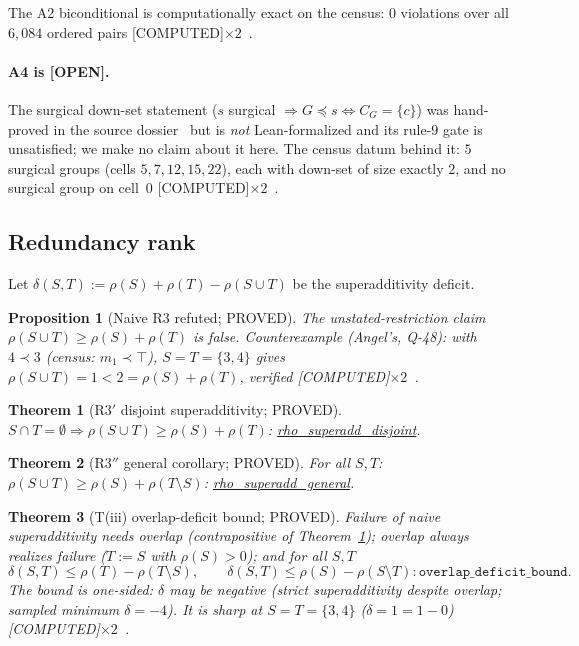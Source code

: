 \documentclass[11pt,a4paper]{article}
\newtheorem{theorem}{Theorem}
\newtheorem{proposition}{Proposition}
\theoremstyle{definition}
\begin{document}
The A2 biconditional is computationally exact on the census: $0$ violations
over all $6{,}084$ ordered pairs [COMPUTED]$\times2$~\cite{D304}.

\paragraph{A4 is [OPEN].} The surgical down-set statement
($s$ surgical $\Rightarrow G\preceq s\iff C_G=\{c\}$) was hand-proved in the
source dossier~\cite{D304} but is \emph{not} Lean-formalized and its rule-9
gate is unsatisfied; we make no claim about it here.  The census datum
behind it: $5$ surgical groups (cells $5,7,12,15,22$), each with down-set of
size exactly $2$, and no surgical group on cell~$0$
[COMPUTED]$\times2$~\cite{D304}.

\subsection{Redundancy rank}
\label{sec:rho}

Let $\delta(S,T):=\rho(S)+\rho(T)-\rho(S\cup T)$ be the superadditivity
deficit.

\begin{proposition}[Naive R3 refuted; PROVED]
  \label{prop:r3refuted}
  The unstated-restriction claim $\rho(S\cup T)\ge\rho(S)+\rho(T)$ is false.
  Counterexample (Angel's, Q-48): with $4\prec 3$ (census: $m_1\prec\top$),
  $S=T=\{3,4\}$ gives $\rho(S\cup T)=1<2=\rho(S)+\rho(T)$, verified
  [COMPUTED]$\times2$~\cite{D315}.
\end{proposition}

\begin{theorem}[R3$'$ disjoint superadditivity; PROVED]
  \label{thm:r3p}
  $S\cap T=\emptyset\Rightarrow\rho(S\cup T)\ge\rho(S)+\rho(T)$:
  \url{rho_superadd_disjoint}.
\end{theorem}

\begin{theorem}[R3$''$ general corollary; PROVED]
  \label{thm:r3pp}
  For all $S,T$: $\rho(S\cup T)\ge\rho(S)+\rho(T\setminus S)$:
  \url{rho_superadd_general}.
\end{theorem}

\begin{theorem}[T(iii) overlap-deficit bound; PROVED]
  \label{thm:tb}
  Failure of naive superadditivity needs overlap (contrapositive of
  Theorem~\ref{thm:r3p}); overlap always realizes failure
  ($T:=S$ with $\rho(S)>0$); and for all $S,T$
  \begin{equation}
    \label{eq:deficitbound}
    \delta(S,T)\le\rho(T)-\rho(T\setminus S),\qquad
    \delta(S,T)\le\rho(S)-\rho(S\setminus T):
    \texttt{overlap\_deficit\_bound}.
  \end{equation}
  The bound is one-sided: $\delta$ may be negative (strict superadditivity
  despite overlap; sampled minimum $\delta=-4$).  It is sharp at
  $S=T=\{3,4\}$ ($\delta=1=1-0$) [COMPUTED]$\times2$~\cite{D315}.
\end{theorem}
\end{document}
